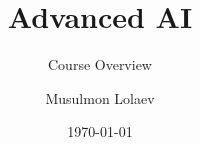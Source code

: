 \documentclass[aspectratio=169]{beamer}
\title{Advanced AI}
\subtitle{Course Overview}
\author{Musulmon Lolaev}
\institute{TQQT LLC}
\date{\today}
\begin{document}
\begin{frame}
\titlepage
\end{frame}


\end{document}
